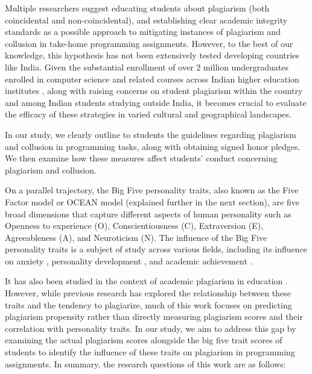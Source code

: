 Multiple researchers suggest educating students about plagiarism (both coincidental and non-coincidental), and establishing clear academic integrity standards as a possible approach to mitigating instances of plagiarism and collusion in take-home programming assignments\cite{10.1145/3506717, 10.1145/2591708.2591755, 10.1145/2632320.2632342, Joy2011SourceCP}. However, to the best of our knowledge, this hypothesis has not been extensively tested developing countries like India. Given the substantial enrollment of over 2 million undergraduates enrolled in computer science and related courses across Indian higher education institutes \cite{departmentofhighereducationgovernmentofindiaAllIndiaSurvey2021}, along with raising concerns on student plagiarism within the country\cite{bakthavatchaalam2021academic} and among Indian students studying outside India\cite{plagiairmInIndia}, it becomes crucial to evaluate the efficacy of these strategies in varied cultural and geographical landscapes.

In our study, we clearly outline to students the guidelines regarding plagiarism and collusion in programming tasks, along with obtaining signed honor pledges. We then examine how these measures affect students' conduct concerning plagiarism and collusion.

On a parallel trajectory, the Big Five personality traits, also known as the Five Factor model or OCEAN model (explained further in the next section), are five broad dimensions that capture different aspects of human personality such as Openness to experience (O), Conscientiousness (C), Extraversion (E), Agreeableness (A), and Neuroticism (N). The influence of the Big Five personality traits is a subject of study across various fields, including its influence on anxiety \cite{AnxityBigfive}, personality development \cite{Tetzner}, and academic achievement \cite{AchievementBigfive, https://doi.org/10.1111/jopy.12663, OZ2015PER}. 

It has also been studied in the context of academic plagiarism in education \cite{Giluk2015BigFP, Bhutto2019ACS}. However, while previous research has explored the relationship between these traits and the tendency to plagiarize, much of this work focuses on predicting plagiarism propensity rather than directly measuring plagiarism scores and their correlation with personality traits. In our study, we aim to address this gap by examining the actual plagiarism scores alongside the big five trait scores of students to identify the influence of these traits on plagiarism in programming assignments. In summary, the research questions of this work are as follows:

